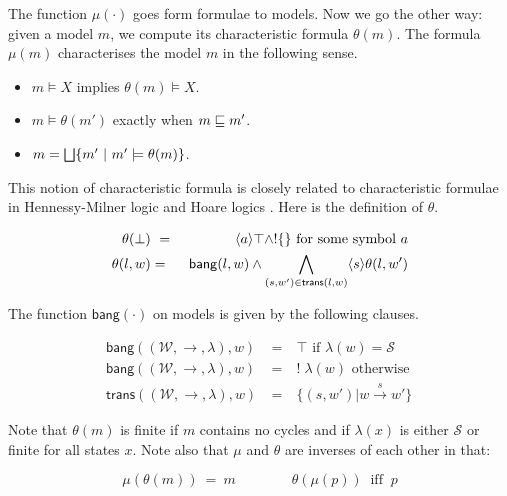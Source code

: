 The function $\mu(\cdot)$ goes form formulae to models. Now we go the
other way: given a model $m$, we compute its characteristic formula
$\theta(m)$. The formula $\mu(m)$ characterises the model $m$ in the
following sense. 

\begin{itemize}

\item  $m \models X$ implies $\theta(m) \models X$.

\item  $m \models \theta( m' )$ exactly when $m \sqsubseteq m'$.

\item $m = \bigsqcup \{m' \ |\ m' \models \theta(m) \}$.

\end{itemize}

\NI This notion of characteristic formula is closely related to
characteristic formulae in Hennessy-Milner logic
\cite{AcetoL:chaforfata} and Hoare logics
\cite{HondaK:descriptive,ChargueraudA:provertcf}. Here is the
definition of $\theta$.

\begin{eqnarray*}
  \theta(\bot) &\ =\ & \langle a \rangle \top \land ! \{ \} \mbox{ for some symbol }a  \\
  \theta(l, w) & = & \mathsf{bang}(l,w) \land \bigwedge_{(s,w') \in \mathsf{trans}(l,w)} \langle s \rangle \theta(l, w')  
\end{eqnarray*}


\NI The function $\mathsf{bang}(\cdot)$ on models is given by the following clauses.

\begin{eqnarray*}
\mathsf{bang}((\mathcal{W},\rightarrow,\lambda),w) & \ = \ & \top \mbox{ if } \lambda(w) = \mathcal{S}  \\
\mathsf{bang}((\mathcal{W},\rightarrow,\lambda),w) & \ = \ & ! \; \lambda(w) \mbox{ otherwise }  \\
\mathsf{trans}((\mathcal{W},\rightarrow, \lambda),w) & \ = \ & \{(s,w') | w \xrightarrow{s} w' \} 
\end{eqnarray*}

\NI Note that $\theta(m)$ is finite if $m$ contains no cycles and if
$\lambda(x)$ is either $\mathcal{S}$ or finite for all states $x$.
Note also that $\mu$ and $\theta$ are inverses of each other in that:

\[
   \mu(\theta(m)) \ = \  m  
      \qquad\qquad
   \theta(\mu(p)) \ \text{ iff } \ p 
\]

